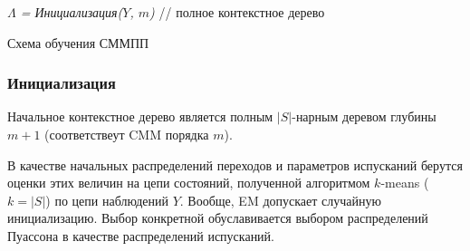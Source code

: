 \documentclass{matmex-diploma-custom}
\begin{document}
\begin{algorithm}[H]
 \textit{
 $\Lambda$ = Инициализация($Y$, $m$)
 }\;
 // полное контекстное дерево\\
 \caption{Схема обучения СММПП}
 \label{alg}
\end{algorithm}


\subsubsection{Инициализация}
Начальное контекстное дерево является полным $|S|$-нарным деревом глубины $m+1$ (соответствеут CMM порядка $m$).

В качестве начальных распределений переходов и параметров испусканий берутся оценки этих величин на цепи состояний, полученной алгоритмом $k$-means ($k=|S|$) по цепи наблюдений $Y$. 
Вообще, EM допускает случайную инициализацию. Выбор конкретной обуславивается выбором распределений Пуассона в качестве распределений испусканий.
\end{document}
